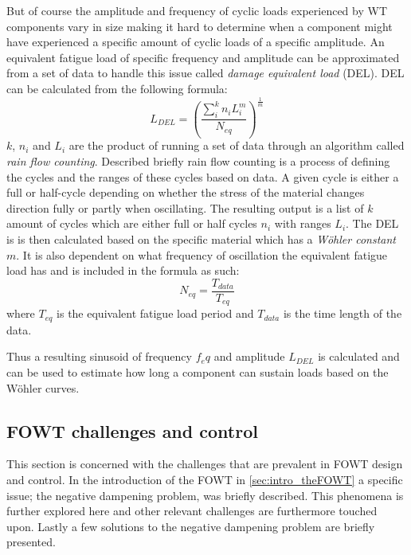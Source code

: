 But of course the amplitude and frequency of cyclic loads experienced by WT components vary in size making it hard to determine when a component might have experienced a specific amount of cyclic loads of a specific amplitude. An equivalent fatigue load of specific frequency and amplitude can be approximated from a set of data to handle this issue called \textit{damage equivalent load} (DEL). DEL can be calculated from the following formula:
\begin{equation}\label{eq:del}
	L_{DEL} = \left( \dfrac{\sum_{i}^{k}n_i L_i^m}{N_{eq}} \right)^{\frac{1}{m}}
\end{equation}
$ k $, $ n_i $ and $ L_i $ are the product of running a set of data through an algorithm called \textit{rain flow counting}. Described briefly rain flow counting is a process of defining the cycles and the ranges of these cycles based on data. A given cycle is either a full or half-cycle depending on whether the stress of the material changes direction fully or partly when oscillating. The resulting output is a list of $ k $ amount of cycles which are either full or half cycles $ n_i $ with ranges $ L_i $. The DEL is is then calculated based on the specific material which has a \textit{Wöhler constant} $ m $. It is also dependent on what frequency of oscillation the equivalent fatigue load has and is included in the formula as such:
\begin{equation}\label{key}
	N_{eq} = \dfrac{T_{data}}{T_{eq}}
\end{equation} 
where $ T_{eq} $ is the equivalent fatigue load period and $ T_{data} $ is the time length of the data.

Thus a resulting sinusoid of frequency $ f_eq $ and amplitude $ L_{DEL} $ is calculated and can be used to estimate how long a component can sustain loads based on the Wöhler curves.



\subsection{FOWT challenges and control} \label{sec:theory_fowt_challenges}
This section is concerned with the challenges that are prevalent in FOWT design and control. In the introduction of the FOWT in \cref{sec:intro_theFOWT} a specific issue; the negative dampening problem, was briefly described. This phenomena is further explored here and other relevant challenges are furthermore touched upon. Lastly a few solutions to the negative dampening problem are briefly presented.

